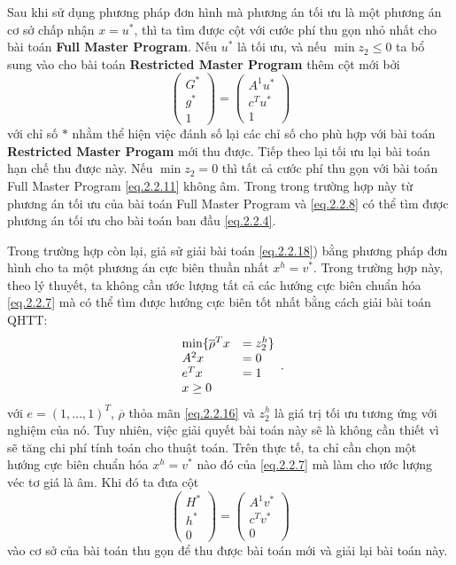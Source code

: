 Sau khi sử dụng phương pháp đơn hình mà phương án tối ưu là một phương án cơ sở chấp nhận $x = u^\ast$, thì ta tìm được cột với cước phí thu gọn nhỏ nhất cho bài toán {\bf Full Master Program}. Nếu $u^\ast$ là tối ưu, và nếu $\min z_2 \leq 0$ ta bổ sung vào cho bài toán {\bf Restricted Master Program} thêm cột mới bởi
\begin{equation}\label{eq.2.2.19}
\begin{pmatrix}
G^\ast\\
g^\ast\\
1
\end{pmatrix}
=
\begin{pmatrix}
A^1u^\ast\\
c^Tu^\ast\\
1
\end{pmatrix}
\end{equation}
với chỉ số $\ast$ nhằm thể hiện việc đánh số lại các chỉ số cho phù hợp với bài toán {\bf Restricted Master Progam} mới thu được. Tiếp theo lại tối ưu lại bài toán hạn chế thu được này. Nếu $\min z_2 = 0$ thì tất cả cước phí thu gọn với bài toán Full Master Program \eqref{eq.2.2.11} không âm. Trong trong trường hợp này từ phương án tối ưu của bài toán Full Master Program và \eqref{eq.2.2.8} có thể tìm được phương án tối ưu cho bài toán ban đầu \eqref{eq.2.2.4}.

Trong trường hợp còn lại, giả sử giải bài toán \eqref{eq.2.2.18}) bằng phương pháp đơn hình cho ta một phương án cực biên thuần nhất $x^h = v^\ast$. Trong trường hợp này, theo lý thuyết, ta không cần ước lượng tất cả các hướng cực biên chuẩn hóa \eqref{eq.2.2.7} mà có thể tìm được hướng cực biên tốt nhất bằng cách giải bài toán QHTT:
\begin{equation}\label{eq.2.2.20}
 \begin{array}{ll}
\min\{ \overline \rho^Tx &= z_2^h\}\\
A^2x &= 0\\
e^Tx &= 1\\
x \geq 0
\end{array}  .
\end{equation}
với $e=(1,\dots,1)^T$, $\overline\rho$ thỏa mãn \eqref{eq.2.2.16} và $z_2^h$ là giá trị tối ưu tương ứng với nghiệm của nó. Tuy nhiên, việc giải quyết bài toán này sẽ là không cần thiết vì sẽ tăng chi phí tính toán cho thuật toán. Trên thực tế, ta chỉ cần chọn một hướng cực biên chuẩn hóa $x^h=v^\ast$ nào đó của \eqref{eq.2.2.7} mà làm cho ước lượng véc tơ giá là âm. Khi đó ta đưa cột 
\begin{equation}\label{eq.2.2.21}
\begin{pmatrix}
H^\ast\\
h^\ast\\
0
\end{pmatrix}
=
\begin{pmatrix}
A^1v^\ast\\
c^Tv^\ast\\
0
\end{pmatrix}
\end{equation}
vào cơ sở của bài toán thu gọn để thu được bài toán mới và giải lại bài toán này.

